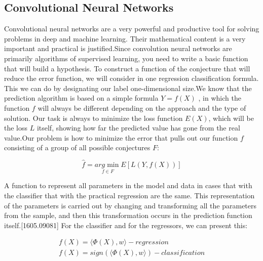 \subsection{Convolutional Neural Networks}\label{sec:3.8.1}
\par Convolutional neural networks are a very powerful and productive tool for solving problems in deep and machine learning. Their mathematical content is a very important and practical is justified.Since convolution neural networks are primarily algorithms of supervised learning, you need to write a basic function that will build a hypothesis. To construct a function of the conjecture that will reduce the error function, we will consider in one regression classification formula. This we can do by designating our label one-dimensional size.We know that the prediction algorithm is based on a simple formula $ Y = f(X)$ , in which the function $f$ will always be different depending on the approach and the type of solution. Our task is always to minimize the loss function $E(X)$, which will be the loss $L$ itself, showing how far the predicted value has gone from the real value.Our problem is how to minimize the error that pulls out our function $f$ consisting of a group of all possible conjectures $F$:


\begin{equation}
\hat{f} = \underset{f\in F}{arg\min}E[L(Y,f(X))]
\end{equation}

\par A function to represent all parameters in the model and data in cases that with the classifier that with the practical regression are the same. This representation of the parameters is carried out by changing and transforming all the parameters from the sample, and then this transformation occurs in the prediction function itself.[1605.09081]  For the classifier and for the regressors, we can present this:

\begin{equation}
\begin{split}
f(X) = \langle \Phi(X), w\rangle - regression \\
f(X) = sign(\langle \Phi(X), w\rangle) -  classification
\end{split}
\end{equation}

